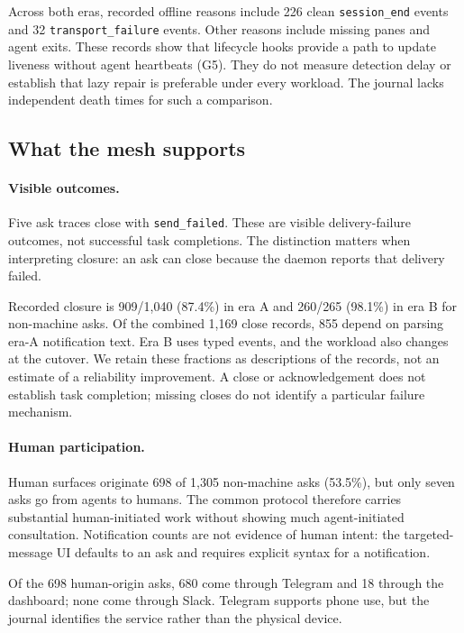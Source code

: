 \documentclass[10pt,twocolumn]{article}
\newcommand{\code}[1]{\texttt{#1}}
\begin{document}
Across both eras, recorded offline reasons include 226 clean \code{session\_end} events and 32 \code{transport\_failure} events. Other reasons include missing panes and agent exits. These records show that lifecycle hooks provide a path to update liveness without agent heartbeats (G5). They do not measure detection delay or establish that lazy repair is preferable under every workload. The journal lacks independent death times for such a comparison.

\subsection{What the mesh supports}
\label{sec:closure}\label{sec:traffic}\label{sec:hetero}

\paragraph{Visible outcomes.}
Five ask traces close with \code{send\_failed}. These are visible delivery-failure outcomes, not successful task completions. The distinction matters when interpreting closure: an ask can close because the daemon reports that delivery failed.

Recorded closure is 909/1,040 (87.4\%) in era A and 260/265 (98.1\%) in era B for non-machine asks. Of the combined 1,169 close records, 855 depend on parsing era-A notification text. Era B uses typed events, and the workload also changes at the cutover. We retain these fractions as descriptions of the records, not an estimate of a reliability improvement. A close or acknowledgement does not establish task completion; missing closes do not identify a particular failure mechanism.

\paragraph{Human participation.}
Human surfaces originate 698 of 1,305 non-machine asks (53.5\%), but only seven asks go from agents to humans. The common protocol therefore carries substantial human-initiated work without showing much agent-initiated consultation. Notification counts are not evidence of human intent: the targeted-message UI defaults to an ask and requires explicit syntax for a notification.

Of the 698 human-origin asks, 680 come through Telegram and 18 through the dashboard; none come through Slack. Telegram supports phone use, but the journal identifies the service rather than the physical device.
\end{document}

